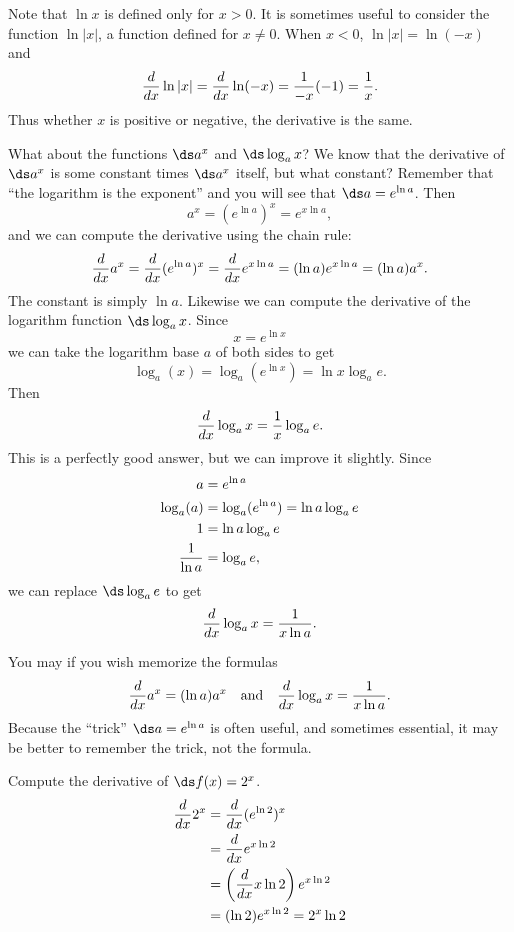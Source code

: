 Note that $\ln x$ is defined only for $x>0$. It is sometimes useful to
consider the function $\ln |x|$, a function defined for
$x\not=0$. When $x<0$, $\ln |x|=\ln(-x)$ and 
$${d\over dx}\ln |x|={d\over dx}\ln (-x)={1\over -x}(-1)={1\over x}.$$
Thus whether $x$ is positive or negative, the derivative is the same.

What about the functions $\ds a^x$ and $\ds \log_a x$? We know that the
derivative of $\ds a^x$ is some constant times $\ds a^x$ itself, but what
constant? Remember that ``the logarithm is the exponent'' and you will
see that $\ds a=e^{\ln a}$. Then
$$a^x = (e^{\ln a})^x = e^{x\ln a},$$
and we can compute the derivative using the chain rule:
$${d\over dx} a^x = {d\over dx}(e^{\ln a})^x = {d\over dx}e^{x\ln a} = 
(\ln a)e^{x\ln a} =(\ln a)a^x.$$
The constant is simply $\ln a$. Likewise we can compute the derivative
of the logarithm function $\ds \log_a x$. Since
$$x=e^{\ln x}$$
we can take the logarithm base $a$ of both sides to get
$$
\log_a(x)=\log_a(e^{\ln x})=\ln x \log_a e.
$$
Then
$${d\over dx}\log_a x = {1\over x}\log_a e.$$
This is a perfectly good answer, but we can improve it slightly.
Since 
\begin{align*}
a&=e^{\ln a} \\
\log_a(a) &= \log_a(e^{\ln a}) = \ln a\log_a e \\
1&=\ln a\log_a e \\
{1\over \ln a}&=\log_a e, \\
\end{align*}
we can replace $\ds \log_a e$ to get
$${d\over dx}\log_a x = {1\over x\ln a}.$$

You may if you wish memorize the formulas
$${d\over dx}a^x = (\ln a)a^x \quad \hbox{and}\quad
{d\over dx}\log_a x = {1\over x\ln a}.$$
Because the ``trick'' $\ds a=e^{\ln a}$ is often useful, and sometimes
essential, it may be better to remember the trick, not the formula.

\begin{example}
Compute the derivative of $\ds f(x)=2^x$.
\begin{align*}
{d\over dx}2^{x} &= {d\over dx}(e^{\ln 2})^x \\
&= {d\over dx}e^{x\ln 2} \\
&= \left({d\over dx} x\ln 2\right) e^{x\ln 2} \\
&= (\ln 2)  e^{x\ln 2}=2^x\ln2 \\
\end{align*}
\vskip-10pt
\end{example}

